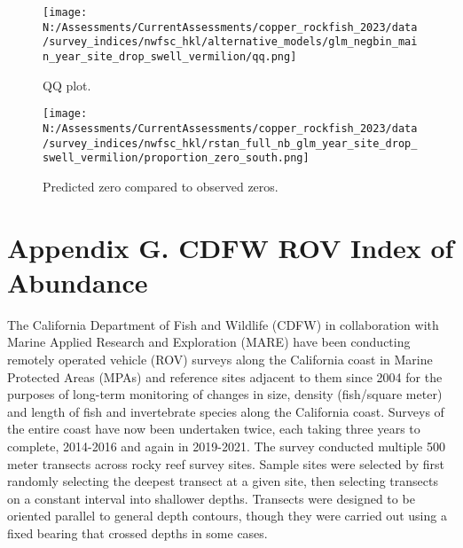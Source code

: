\documentclass[11pt,
  english,
  letterpaper,
]{article}
\begin{document}
\begin{figure}
\centering
\texttt{[image: N:/Assessments/CurrentAssessments/copper\_rockfish\_2023/data/survey\_indices/nwfsc\_hkl/alternative\_models/glm\_negbin\_main\_year\_site\_drop\_swell\_vermilion/qq.png]}
\caption{QQ plot.\label{fig:nwfsc-hkl-qq}}
\end{figure}

\begin{figure}
\centering
\texttt{[image: N:/Assessments/CurrentAssessments/copper\_rockfish\_2023/data/survey\_indices/nwfsc\_hkl/rstan\_full\_nb\_glm\_year\_site\_drop\_swell\_vermilion/proportion\_zero\_south.png]}
\caption{Predicted zero compared to observed zeros.\label{fig:nwfsc-hkl-prop-zero}}
\end{figure}

\newpage

\hypertarget{cdfw-rov-index}{%
\section{Appendix G. CDFW ROV Index of Abundance}\label{cdfw-rov-index}}

The California Department of Fish and Wildlife (CDFW) in collaboration with Marine Applied Research and Exploration (MARE) have been conducting remotely operated vehicle (ROV) surveys along the California coast in Marine Protected Areas (MPAs) and reference sites adjacent to them since 2004 for the purposes of long-term monitoring of changes in size, density (fish/square meter) and length of fish and invertebrate species along the California coast. Surveys of the entire coast have now been undertaken twice, each taking three years to complete, 2014-2016 and again in 2019-2021. The survey conducted multiple 500 meter transects across rocky reef survey sites. Sample sites were selected by first randomly selecting the deepest transect at a given site, then selecting transects on a constant interval into shallower depths. Transects were designed to be oriented parallel to general depth contours, though they were carried out using a fixed bearing that crossed depths in some cases.
\end{document}
